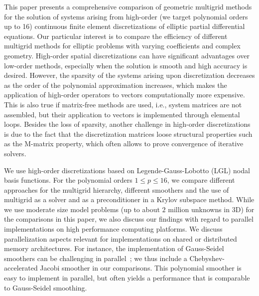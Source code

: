 \documentclass[smallcondensed,final]{svjour3}     %
\begin{document}
This paper presents a comprehensive comparison of geometric multigrid
methods for the solution of systems arising from high-order (we target
polynomial orders up to 16) continuous finite element discretizations
of elliptic partial differential equations. Our particular interest is
to compare the efficiency of different multigrid methods for elliptic
problems with varying coefficients and complex geometry.
High-order spatial discretizations can have significant advantages
over low-order methods, especially when the solution is smooth and
high accuracy is desired. However, the sparsity of the systems arising
upon discretization decreases as the order of the polynomial
approximation increases, which makes the application of high-order
operators to vectors computationally more expensive. This is also true
if matrix-free methods are used, i.e., system matrices are not
assembled, but their application to vectors is implemented through
elemental loops.  Besides the loss of sparsity, another challenge in
high-order discretizations is due to the fact that the discretization
matrices loose structural properties such as the M-matrix property,
which often allows to prove convergence of iterative solvers.

We use high-order discretizations based on Legende-Gauss-Lobotto (LGL) nodal
basis functions. For the polynomial orders $1\le p\le 16$, we compare different approaches for the multigrid hierarchy, different smoothers and the use of multigrid as a solver
and as a preconditioner in a Krylov subspace method.  While we use moderate
size model problems (up to about $2$ million unknowns in 3D) for the comparisons in this
paper, we also discuss our findings with regard to parallel implementations on
high performance computing platforms.
We discuss parallelization aspects relevant for implementations on
shared or distributed memory architectures. For instance, the implementation of
Gauss-Seidel smoothers can be challenging in
parallel~\cite{AdamsBrezinaHuEtAl03, BakerFalgoutKolevEtAl11}; we thus include
a Chebyshev-accelerated Jacobi smoother in our comparisons. This polynomial
smoother is easy to implement in parallel, but often yields a performance that
is comparable to Gauss-Seidel smoothing.
\end{document}
